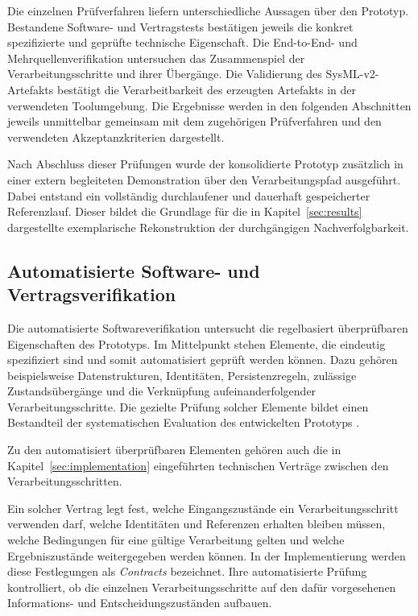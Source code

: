 Die einzelnen Prüfverfahren liefern unterschiedliche Aussagen über den
Prototyp. Bestandene Software- und Vertragstests bestätigen jeweils die
konkret spezifizierte und geprüfte technische Eigenschaft. Die
End-to-End- und Mehrquellenverifikation untersuchen das Zusammenspiel der
Verarbeitungsschritte und ihrer Übergänge. Die Validierung des
SysML-v2-Artefakts bestätigt die Verarbeitbarkeit des erzeugten Artefakts in
der verwendeten Toolumgebung. Die Ergebnisse werden in den folgenden
Abschnitten jeweils unmittelbar gemeinsam mit dem zugehörigen Prüfverfahren
und den verwendeten Akzeptanzkriterien dargestellt.

Nach Abschluss dieser Prüfungen wurde der konsolidierte Prototyp zusätzlich
in einer extern begleiteten Demonstration über den Verarbeitungspfad
ausgeführt. Dabei entstand ein vollständig durchlaufener und dauerhaft
gespeicherter Referenzlauf. Dieser bildet die Grundlage für die in
Kapitel~\ref{sec:results} dargestellte exemplarische Rekonstruktion der
durchgängigen Nachverfolgbarkeit.

\subsection{Automatisierte Software- und Vertragsverifikation}
\label{sec:validation_software}

Die automatisierte Softwareverifikation untersucht die regelbasiert
überprüfbaren Eigenschaften des Prototyps. Im Mittelpunkt stehen Elemente,
die eindeutig spezifiziert sind und somit automatisiert geprüft werden
können. Dazu gehören beispielsweise Datenstrukturen, Identitäten,
Persistenzregeln, zulässige Zustandsübergänge und die Verknüpfung
aufeinanderfolgender Verarbeitungsschritte. Die gezielte Prüfung solcher
Elemente bildet einen Bestandteil der systematischen Evaluation des
entwickelten Prototyps
\cite{Wieringa2014,ISO42030}.

Zu den automatisiert überprüfbaren Elementen gehören auch die in
Kapitel~\ref{sec:implementation} eingeführten technischen Verträge zwischen
den Verarbeitungsschritten. 

\noindent Ein solcher Vertrag legt fest, welche
Eingangszustände ein Verarbeitungsschritt verwenden darf, welche Identitäten
und Referenzen erhalten bleiben müssen, welche Bedingungen für eine gültige
Verarbeitung gelten und welche Ergebniszustände weitergegeben werden können.
In der Implementierung werden diese Festlegungen als \emph{Contracts}
bezeichnet. Ihre automatisierte Prüfung kontrolliert, ob die einzelnen
Verarbeitungsschritte auf den dafür vorgesehenen Informations- und
Entscheidungszuständen aufbauen.

